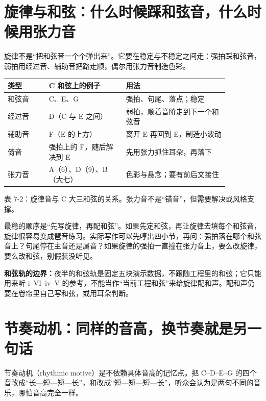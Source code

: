 \section{旋律与和弦：什么时候踩和弦音，什么时候用张力音}

旋律不是“把和弦音一个个弹出来”。它要在稳定与不稳定之间走：强拍踩和弦音，弱拍用经过音、辅助音把路走顺，偶尔用张力音制造色彩。

\begin{center}
\begin{minipage}{\linewidth}
\centering
\small
\begin{tabular}{p{0.16\linewidth}p{0.30\linewidth}p{0.40\linewidth}}
\toprule
类型 & C 和弦上的例子 & 用法 \\
\midrule
和弦音 & C、E、G & 强拍、句尾、落点；稳定 \\
经过音 & D（C 与 E 之间） & 弱拍，顺着音阶走到下一个和弦音 \\
辅助音 & F（E 的上方） & 离开 E 再回到 E，制造小波动 \\
倚音 & 强拍上的 F，随后解决到 E & 先用张力抓住耳朵，再落下 \\
张力音 & A（6）、D（9）、B（大七） & 色彩与悬念；要有前后文接住 \\
\bottomrule
\end{tabular}

表 7-2：旋律音与 C 大三和弦的关系。张力音不是“错音”，但需要解决或风格支撑。
\end{minipage}
\end{center}

最稳的顺序是“先写旋律，再配和弦”。如果先定和弦，再让旋律去填每个和弦音，旋律很容易变成琶音练习。实际写作可以先哼出四小节，再问：强拍落在哪个和弦音上？句尾停在主音还是属音？如果旋律的强拍一直撞在张力音上，要么改旋律，要么改和弦，别假装没听见。

\textbf{和弦轨的边界：}夜半的和弦轨是固定五块演示数据，不跟随工程里的和弦；它只能用来听 i–VI–iv–V 的参考，不能当作“当前工程和弦”来给旋律配和声。配和声仍要在卷帘里自己写和弦，或用耳朵判断。

\section{节奏动机：同样的音高，换节奏就是另一句话}

节奏动机（rhythmic motive）是不依赖具体音高的记忆点。把 C–D–E–G 的四个音改成“长—短—短—长”，和改成“短—短—短—长”，听众会认为是两句不同的音乐，哪怕音高完全一样。

